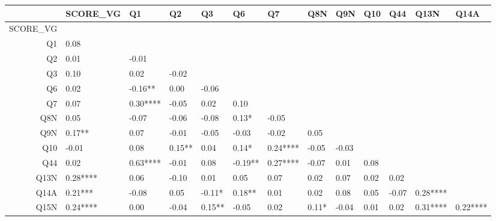 \begin{table}[ht]
\centering
\begin{tabular}{rllllllllllll}
  \hline
 & SCORE\_VG & Q1 & Q2 & Q3 & Q6 & Q7 & Q8N & Q9N & Q10 & Q44 & Q13N & Q14A \\ 
  \hline
SCORE\_VG &  &  &  &  &  &  &  &  &  &  &  &  \\ 
  Q1 &  0.08     &  &  &  &  &  &  &  &  &  &  &  \\ 
  Q2 &  0.01     & -0.01     &  &  &  &  &  &  &  &  &  &  \\ 
  Q3 &  0.10     &  0.02     & -0.02     &  &  &  &  &  &  &  &  &  \\ 
  Q6 &  0.02     & -0.16**   &  0.00     & -0.06     &  &  &  &  &  &  &  &  \\ 
  Q7 &  0.07     &  0.30**** & -0.05     &  0.02     &  0.10     &  &  &  &  &  &  &  \\ 
  Q8N &  0.05     & -0.07     & -0.06     & -0.08     &  0.13*    & -0.05     &  &  &  &  &  &  \\ 
  Q9N &  0.17**   &  0.07     & -0.01     & -0.05     & -0.03     & -0.02     &  0.05     &  &  &  &  &  \\ 
  Q10 & -0.01     &  0.08     &  0.15**   &  0.04     &  0.14*    &  0.24**** & -0.05     & -0.03     &  &  &  &  \\ 
  Q44 &  0.02     &  0.63**** & -0.01     &  0.08     & -0.19**   &  0.27**** & -0.07     &  0.01     &  0.08     &  &  &  \\ 
  Q13N &  0.28**** &  0.06     & -0.10     &  0.01     &  0.05     &  0.07     &  0.02     &  0.07     &  0.02     &  0.02     &  &  \\ 
  Q14A &  0.21***  & -0.08     &  0.05     & -0.11*    &  0.18**   &  0.01     &  0.02     &  0.08     &  0.05     & -0.07     &  0.28**** &  \\ 
  Q15N &  0.24**** &  0.00     & -0.04     &  0.15**   & -0.05     &  0.02     &  0.11*    & -0.04     &  0.01     &  0.02     &  0.31**** &  0.22**** \\ 
   \hline
\end{tabular}
\end{table}
